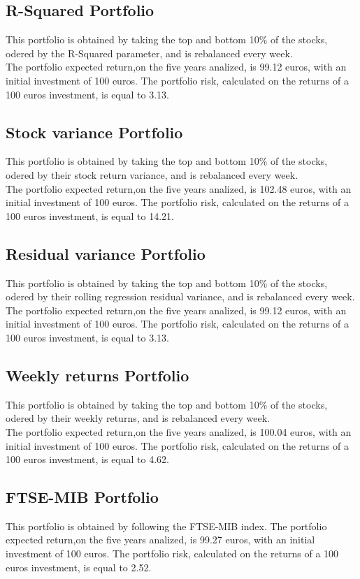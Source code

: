 \documentclass[12pt, a4paper, twocolumn]{article} %
\begin{document}
	\subsection{R-Squared Portfolio}
	This portfolio is obtained by taking the top and bottom 10\% of the stocks, odered by the R-Squared parameter, and is rebalanced every week.\\
	The portfolio expected return,on the five years analized, is 99.12 euros, with an initial investment of 100 euros. The portfolio risk, calculated on the returns of a 100 euros investment, is equal to 3.13.
	\subsection{Stock variance Portfolio}
	This portfolio is obtained by taking the top and bottom 10\% of the stocks, odered by their stock return variance, and is rebalanced every week.\\
	The portfolio expected return,on the five years analized, is 102.48 euros, with an initial investment of 100 euros. The portfolio risk, calculated on the returns of a 100 euros investment, is equal to 14.21.
	\subsection{Residual variance Portfolio}
	This portfolio is obtained by taking the top and bottom 10\% of the stocks, odered by their rolling regression residual variance, and is rebalanced every week.\\
	The portfolio expected return,on the five years analized, is 99.12 euros, with an initial investment of 100 euros. The portfolio risk, calculated on the returns of a 100 euros investment, is equal to 3.13.
	\subsection{Weekly returns Portfolio}
	This portfolio is obtained by taking the top and bottom 10\% of the stocks, odered by their weekly returns, and is rebalanced every week.\\
	The portfolio expected return,on the five years analized, is 100.04 euros, with an initial investment of 100 euros. The portfolio risk, calculated on the returns of a 100 euros investment, is equal to 4.62.
	\subsection{FTSE-MIB Portfolio}
	This portfolio is obtained by following the FTSE-MIB index.
	The portfolio expected return,on the five years analized, is 99.27 euros, with an initial investment of 100 euros. The portfolio risk, calculated on the returns of a 100 euros investment, is equal to 2.52.
	
\end{document}
